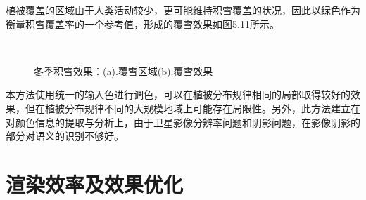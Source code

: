 植被覆盖的区域由于人类活动较少，更可能维持积雪覆盖的状况，因此以绿色作为衡量积雪覆盖率的一个参考值，形成的覆雪效果如图5.11所示。
\begin{figure}[H]
    \centering
     \\
    \caption{冬季积雪效果：(a).覆雪区域(b).覆雪效果}
\end{figure}
本方法使用统一的输入色进行调色，可以在植被分布规律相同的局部取得较好的效果，但在植被分布规律不同的大规模地域上可能存在局限性。另外，此方法建立在对颜色信息的提取与分析上，由于卫星影像分辨率问题和阴影问题，在影像阴影的部分对语义的识别不够好。\par
\section{渲染效率及效果优化}
